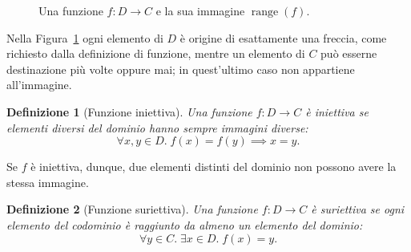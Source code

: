 \documentclass[a4paper, 11pt, oneside]{book}
\theoremstyle{formale}
\newtheorem*{definition}{Definizione}
\begin{document}
    \begin{figure}[H]
        \centering
        \caption{Una funzione $f \colon D \to C$ e la sua immagine
            $\operatorname{range}(f)$.}
        \label{fig:immagine}
    \end{figure}

    Nella Figura~\ref{fig:immagine} ogni elemento di $D$ \`e origine di esattamente una
    freccia, come richiesto dalla definizione di funzione, mentre un elemento di $C$ pu\`o
    esserne destinazione pi\`u volte oppure mai; in quest'ultimo caso non appartiene
    all'immagine.

    \begin{definition}[Funzione iniettiva]
        Una funzione $f \colon D \to C$ \`e \emph{iniettiva} se elementi diversi del
        dominio hanno sempre immagini diverse:
        \begin{equation*}
            \forall x, y \in D.\; f(x) = f(y) \implies x = y.
        \end{equation*}
    \end{definition}
    Se $f$ \`e iniettiva, dunque, due elementi distinti del dominio non possono avere la
    stessa immagine.

    \begin{definition}[Funzione suriettiva]
        Una funzione $f \colon D \to C$ \`e \emph{suriettiva} se ogni elemento del
        codominio \`e raggiunto da almeno un elemento del dominio:
        \begin{equation*}
            \forall y \in C.\; \exists x \in D.\; f(x) = y.
        \end{equation*}
    \end{definition}
\end{document}
